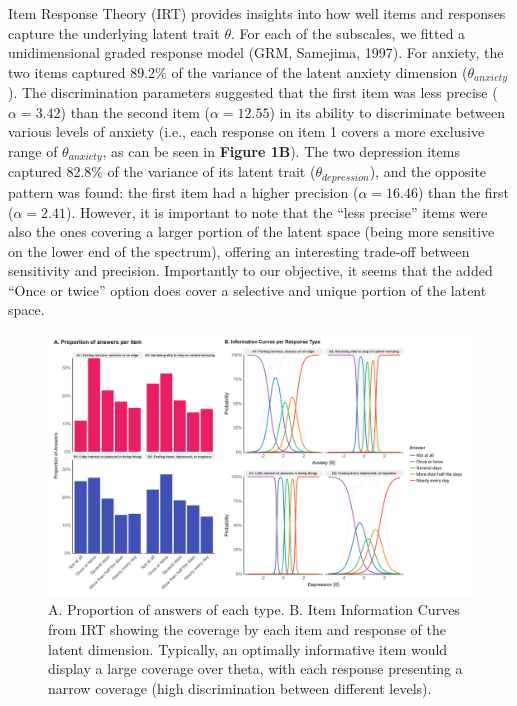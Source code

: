 \documentclass[
  man,floatsintext]{apa6}
\begin{document}
Item Response Theory (IRT) provides insights into how well items and responses capture the underlying latent trait \(\theta\). For each of the subscales, we fitted a unidimensional graded response model (GRM, Samejima, 1997). For anxiety, the two items captured 89.2\% of the variance of the latent anxiety dimension (\(\theta_{anxiety}\)). The discrimination parameters suggested that the first item was less precise (\(\alpha = 3.42\)) than the second item (\(\alpha = 12.55\)) in its ability to discriminate between various levels of anxiety (i.e., each response on item 1 covers a more exclusive range of \(\theta_{anxiety}\), as can be seen in \textbf{Figure 1B}). The two depression items captured 82.8\% of the variance of its latent trait (\(\theta_{depression}\)), and the opposite pattern was found: the first item had a higher precision (\(\alpha = 16.46\)) than the first (\(\alpha = 2.41\)). However, it is important to note that the ``less precise'' items were also the ones covering a larger portion of the latent space (being more sensitive on the lower end of the spectrum), offering an interesting trade-off between sensitivity and precision. Importantly to our objective, it seems that the added ``Once or twice'' option does cover a selective and unique portion of the latent space.

\begin{figure}
\includegraphics[width=1\linewidth]{../figures/figure1} \caption{A. Proportion of answers of each type. B. Item Information Curves from IRT showing the coverage by each item and response of the latent dimension. Typically, an optimally informative item would display a large coverage over theta, with each response presenting a narrow coverage (high discrimination between different levels).}\label{fig:unnamed-chunk-2}
\end{figure}
\end{document}
